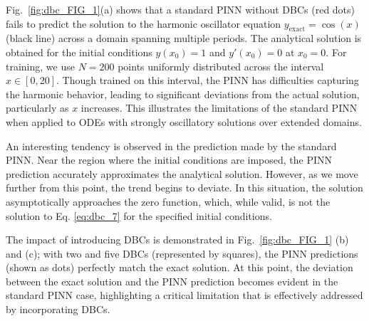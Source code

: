 Fig.~\ref{fig:dbc_FIG_1}(a) shows that a standard PINN without DBCs (red dots) fails to predict the solution to the harmonic oscillator equation $y_{\mathrm{exact}}=\cos(x)$ (black line) across a domain spanning multiple periods. The analytical solution is obtained for the initial conditions $y(x_0 ) = 1$ and $y' (x_0 ) = 0$ at $x_0 = 0$. For training, we use $N = 200$ points uniformly distributed across the interval $x \in [0, 20]$. Though trained on this interval, the PINN has difficulties capturing the harmonic behavior, leading to significant deviations from the actual solution, particularly as $x$ increases. This illustrates the limitations of the standard PINN when applied to ODEs with strongly oscillatory solutions over extended domains.

An interesting tendency is observed in the prediction made by the standard PINN. Near the region where the initial conditions are imposed, the PINN prediction accurately approximates the analytical solution. However, as we move further from this point, the trend begins to deviate. In this situation, the solution asymptotically approaches the zero function, which, while valid, is not the solution to Eq. \ref{eq:dbc_7} for the specified initial conditions.

The impact of introducing DBCs is demonstrated in Fig.~\ref{fig:dbc_FIG_1} (b) and (c); with two and five DBCs (represented by squares), the PINN predictions (shown as dots) perfectly match the exact solution. At this point, the deviation between the exact solution and the PINN prediction becomes evident in the standard PINN case, highlighting a critical limitation that is effectively addressed by incorporating DBCs.


